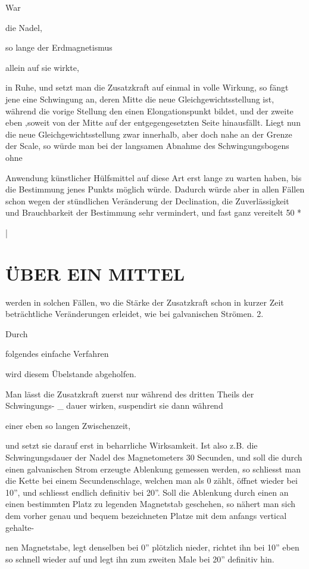 \documentclass[12pt,a4paper]{article}
\begin{document}
War

die Nadel,

so lange der Erdmagnetismus

allein auf sie wirkte,

in Ruhe, und setzt man die Zusatzkraft auf einmal in volle Wirkung, so fängt jene eine Schwingung an, deren Mitte die neue Gleichgewichtsstellung ist, während die vorige Stellung den einen Elongationspunkt bildet, und der zweite eben ‚soweit von der Mitte auf der entgegengesetzten Seite hinausfällt. Liegt nun die neue Gleichgewichtsstellung zwar innerhalb, aber doch nahe an der Grenze der Scale, so würde man bei der langsamen Abnahme des Schwingungsbogens ohne

Anwendung künstlicher Hülfsmittel auf diese Art erst lange zu warten haben, bis die Bestimmung jenes Punkts möglich würde. Dadurch würde aber in allen Fällen schon wegen der stündlichen Veränderung der Declination, die Zuverlässigkeit und Brauchbarkeit der Bestimmung sehr vermindert, und fast ganz vereitelt 50 *

|

\section*{ÜBER EIN MITTEL}
werden in solchen Fällen, wo die Stärke der Zusatzkraft schon in kurzer Zeit beträchtliche Veränderungen erleidet, wie bei galvanischen Strömen. 2.

Durch

folgendes einfache Verfahren

wird diesem Übelstande abgeholfen.

Man lässt die Zusatzkraft zuerst nur während des dritten Theils der Schwingungs- \_ dauer wirken, suspendirt sie dann während

einer eben so langen Zwischenzeit,

und setzt sie darauf erst in beharrliche Wirksamkeit. Ist also z.B. die Schwingungsdauer der Nadel des Magnetometers 30 Secunden, und soll die durch einen galvanischen Strom erzeugte Ablenkung gemessen werden, so schliesst man die Kette bei einem Secundenschlage, welchen man als 0 zählt, öffnet wieder bei 10”, und schliesst endlich definitiv bei 20”. Soll die Ablenkung durch einen an einen bestimmten Platz zu legenden Magnetstab geschehen, so nähert man sich dem vorher genau und bequem bezeichneten Platze mit dem anfangs vertical gehalte-

nen Magnetstabe, legt denselben bei 0” plötzlich nieder, richtet ihn bei 10” eben so schnell wieder auf und legt ihn zum zweiten Male bei 20” definitiv hin.
\end{document}
